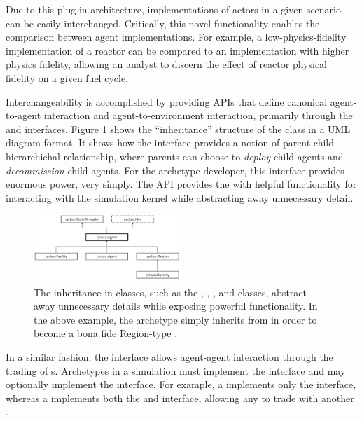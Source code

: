 Due to this plug-in architecture,
implementations of actors in a given scenario can be easily
interchanged. Critically, this novel functionality enables the comparison
between agent implementations. For example, a low-physics-fidelity
implementation of a reactor can be compared to an implementation with higher
physics fidelity, allowing an analyst to discern the effect of reactor physical
fidelity on a given fuel cycle. 

Interchangeability is accomplished by providing \glspl{API} that define canonical agent-to-agent
interaction and agent-to-environment interaction, primarily through the
 and  interfaces. Figure \ref{fig:agent_uml} shows 
the ``inheritance'' structure of the  class in a \gls{UML} diagram 
format. It shows how the  interface
provides a notion of parent-child hierarchichal relationship, where parents can
choose to \textit{deploy} child agents and \textit{decommission} child
agents. For the archetype developer, this interface provides enormous power, 
very simply. The \gls{API} provides the  with helpful functionality for 
interacting with the \Cyclus simulation kernel while abstracting away unnecessary 
detail.

\begin{figure}[htbp!]
\begin{center}
\includegraphics[width=0.5\textwidth]{./images/agent_uml}
\end{center}
\caption{The inheritance in \Cyclus classes, such as the , 
, , and  classes, abstract away 
unnecessary details while exposing powerful functionality. In the above 
example, the  archetype simply inherits from  in 
order to become a bona fide Region-type .}
\label{fig:agent_uml}
\end{figure}

In a similar fashion, the  interface allows agent-agent interaction through the
trading of s. Archetypes in a \Cyclus simulation must
implement the  interface and may optionally implement the
 interface. For example, a  implements only the
 interface, whereas a  implements both the
 and  interface, allowing any  to
trade with another .

